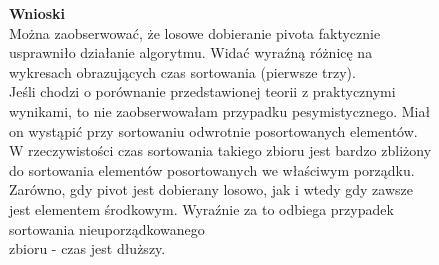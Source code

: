\documentclass[a4paper,11pt]{report}
\begin{document}
\begin{figure}
  \begin{center}
  \textbf{Wnioski}
  \\
Można zaobserwować, że losowe dobieranie pivota faktycznie usprawniło działanie algorytmu. Widać wyraźną różnicę na wykresach obrazujących czas sortowania (pierwsze trzy). 
\\
Jeśli chodzi o porównanie przedstawionej teorii z praktycznymi wynikami, to nie zaobserwowałam przypadku pesymistycznego. Miał on wystąpić przy sortowaniu odwrotnie posortowanych elementów. W rzeczywistości czas sortowania takiego zbioru jest bardzo zbliżony do sortowania elementów posortowanych we właściwym porządku. Zarówno, gdy pivot jest dobierany losowo, jak i wtedy gdy zawsze jest elementem środkowym. Wyraźnie za to odbiega przypadek sortowania nieuporządkowanego \\zbioru - czas jest dłuższy.



    \label{fig:}
  \end{center}
\end{figure}
\end{document}
